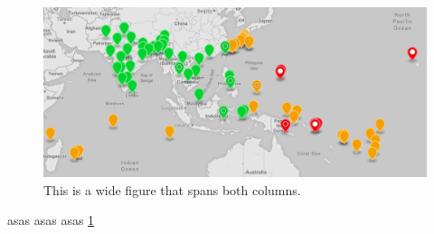 \documentclass[twocolumn]{article}
\begin{document}
\lipsum

\begin{figure}
    \centering
    \includegraphics[width=\textwidth]{images/crb_dist}
    \caption{This is a wide figure that spans both columns.}
    \label{fig:img1}
\end{figure}

\lipsum
asas asas asas \ref{fig:img1}
\end{document}
